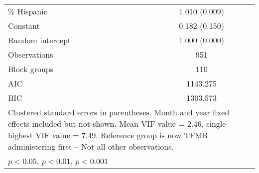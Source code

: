 \begin{table}[htbp]
\begin{adjustbox}{max width=\linewidth}
\begin{tabular}{l*{1}{c}}
\% Hispanic     &1.010 (0.009)        \\
Constant        &0.182\sym{*} (0.150)        \\
\midrule
Random intercept&1.000 (0.000)        \\
\midrule
Observations    &      951        \\
Block groups    &  110        \\
AIC             & 1143.275        \\
BIC             & 1303.573        \\
\bottomrule
\multicolumn{2}{p{16cm}}{\footnotesize Clustered standard errors in parentheses. Month and year fixed effects included but not shown. Mean VIF value = 2.46, single highest VIF value = 7.49. Reference group is now TFMR administering first -- Not all other observations.}\\
\multicolumn{2}{l}{\footnotesize \sym{*} \(p<0.05\), \sym{**} \(p<0.01\), \sym{**} \(p<0.001\)}\\
\end{tabular} \end{adjustbox}
\end{table}
